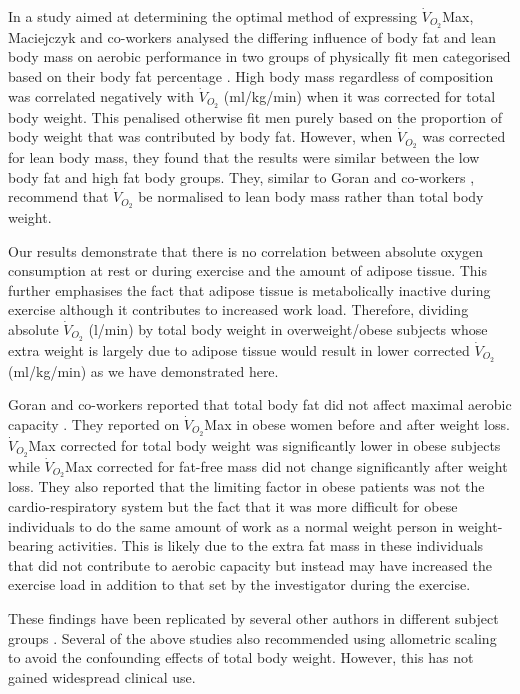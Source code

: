 In a study aimed at determining the optimal method of expressing $\dot{V}_{O_2}$Max, Maciejczyk and co-workers analysed the differing influence of body fat and lean body mass on aerobic performance in two groups of physically fit men categorised based on their body fat percentage \parencite{maciejczyk_influence_2014}. 
High body mass regardless of composition was correlated negatively with $\dot{V}_{O_2}$ (ml/kg/min) when it was corrected for total body weight.
This penalised otherwise fit men purely based on the proportion of body weight that was contributed by body fat. 
However, when $\dot{V}_{O_2}$ was corrected for lean body mass, they found that the results were similar between the low body fat and high fat body groups. 
They, similar to Goran and co-workers \parencite{goran_total_2000}, recommend that $\dot{V}_{O_2}$ be normalised to lean body mass rather than total body weight.

Our results demonstrate that there is no correlation between absolute oxygen consumption at rest or during exercise and the amount of adipose tissue. 
This further emphasises the fact that adipose tissue is metabolically inactive during exercise although it contributes to increased work load. 
Therefore, dividing absolute $\dot{V}_{O_2}$ (l/min) by total body weight in overweight/obese subjects whose extra weight is largely due to adipose tissue would result in lower corrected $\dot{V}_{O_2}$ (ml/kg/min) as we have demonstrated here. 

Goran and co-workers reported that total body fat did not affect maximal aerobic capacity \parencite{goran_total_2000}. 
They reported on $\dot{V}_{O_2}$Max in obese women before and after weight loss. 
$\dot{V}_{O_2}$Max corrected for total body weight was significantly lower in obese subjects while $\dot{V}_{O_2}$Max corrected for fat-free mass did not change significantly after weight loss. 
They also reported that the limiting factor in obese patients was not the cardio-respiratory system but the fact that it was more difficult for obese individuals to do the same amount of work as a normal weight person in weight-bearing activities. 
This is likely due to the extra fat mass in these individuals that did not contribute to aerobic capacity but instead may have increased the exercise load in addition to that set by the investigator during the exercise.

These findings have been replicated by several other authors in different subject groups \parencite{loftin_scaling_2001, lemaitre_maximum_2006, savonen_current_2012, krachler_cardiopulmonary_2014}. 
Several of the above studies also recommended using allometric scaling to avoid the confounding effects of total body weight. 
However, this has not gained widespread clinical use.

